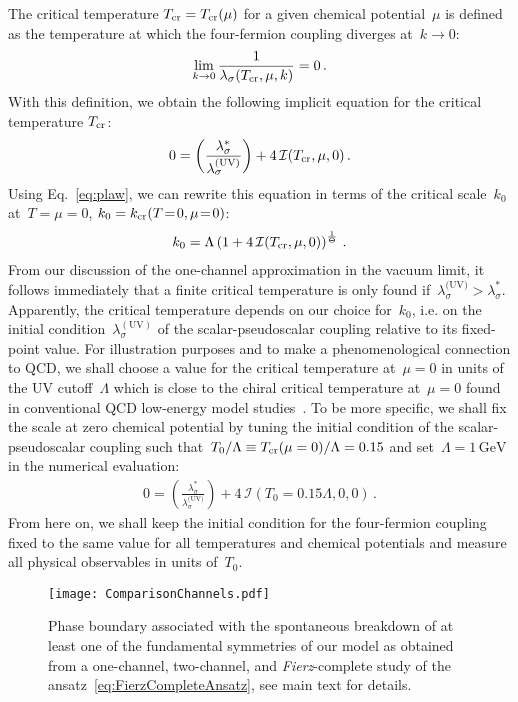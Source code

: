 \documentclass[prd,english,preprintnumbers,amsmath,amssymb,nofootinbib,twocolumn,superscriptaddress]{revtex4-1}
\newcommand{\be}{\begin{eqnarray}}
\newcommand{\ee}{\end{eqnarray}}
\begin{document}
{The critical temperature $T_{\rm cr}=T_{\rm cr}(\mu)$ for a given chemical potential~$\mu$ is defined as the temperature at which the 
four-fermion coupling diverges at~$k\to 0$: 
%
\be
\lim_{k\to 0} \frac{1}{\lambda_{\sigma}(T_{\rm cr},\mu,k)}=0\,.
\ee
%
With this definition, we obtain the following implicit equation for the critical temperature $T_{\rm cr}$:
%
\be
0 =  \left(\frac{\lambda_{\sigma}^{\ast}}{\lambda_\sigma^\text{(UV)}}\right) + 4\, {\mathcal I}(T_{\rm cr}, \mu , 0)\,.
\ee
%
Using Eq.~\eqref{eq:plaw}, we can rewrite this equation in terms of the critical scale~$k_{0}$ at~$T\!=\!\mu\!=\!0$, $k_{0}=k_{\rm cr}(T\!=\!0,\mu\!=\!0)$:
%
\be
 k_{0} = \Lambda\left(1 + 4\,{\mathcal I}(T_{\rm cr}, \mu , 0)\right)^{\frac{1}{\Theta}}  \,.
\ee
From our discussion of the one-channel approximation in the vacuum limit, it follows immediately that a finite critical
temperature is only found if~$ \lambda_\sigma^\text{(UV)}>\lambda_{\sigma}^{\ast}$.
Apparently, the critical temperature depends on our choice for~$k_{0}$, i.e. on 
the initial condition~$\lambda_{\sigma}^{(\text{UV})}$ of
the scalar-pseudoscalar coupling relative to its fixed-point value. For illustration purposes and
to make a phenomenological connection to QCD, we shall choose a value for the critical temperature at~$\mu=0$ in units of the UV cutoff~$\Lambda$ 
which is close to the chiral critical temperature at~$\mu=0$ found in conventional QCD 
low-energy model studies~\cite{Klevansky:1992qe,Buballa:2003qv,Fukushima:2011jc,Andersen:2014xxa}. 
 To be more specific, we shall fix 
the scale at zero chemical potential 
by tuning the initial condition of the scalar-pseudoscalar coupling such that~$T_0/\Lambda \equiv T_{\rm cr}(\mu=0)/\Lambda=0.15$ 
{and set~$\Lambda=1\,\text{GeV}$}
in the numerical evaluation:
%
\be
0 = \left(\frac{\lambda_{\sigma}^{\ast}}{\lambda_\sigma^\text{(UV)}}\right) + 4\, {\mathcal I}(T_0 \!=\! 0.15 \Lambda,0,0)\,.
\ee
%
From here
on, we shall keep the initial condition for the four-fermion coupling fixed to the same value for all 
temperatures and chemical potentials and measure all physical observables in units of~$T_0$.
%
\begin{figure}[t]
\center
\texttt{[image: ComparisonChannels.pdf]}
\caption{Phase boundary associated with the spontaneous breakdown of at least one of the fundamental symmetries of our model
as obtained from a one-channel, two-channel, and {\it Fierz}-complete
study of the ansatz~\eqref{eq:FierzCompleteAnsatz}, see main text for details.} 
\label{fig:ComparisonChannels}
\end{figure}
%

}
\end{document}
